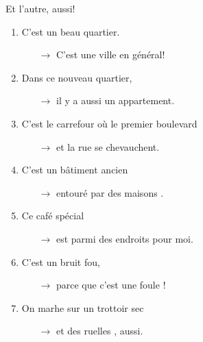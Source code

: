 \begin{frame}{Et l'autre, aussi!}
  \begin{enumerate}
    \item C'est un \alert{beau} quartier.
    \begin{itemize}
      \item[$\to$] C'est une \underline{} ville en général!
    \end{itemize}
    \item Dans ce \alert{nouveau} quartier,
    \begin{itemize}
      \item[$\to$] il y a aussi un \underline{} appartement.
    \end{itemize}
    \item C'est le carrefour où le \alert{premier} boulevard
    \begin{itemize}
      \item[$\to$] et la \underline{} rue se chevauchent.
    \end{itemize}
    \item C'est un bâtiment \alert{ancien}
    \begin{itemize}
      \item[$\to$] entouré par des maisons \underline{}.
    \end{itemize}
    \item Ce café \alert{spécial}
    \begin{itemize}
      \item[$\to$] est parmi des endroits \underline{} pour moi.
    \end{itemize}
    \item C'est un bruit \alert{fou},
    \begin{itemize}
      \item[$\to$] parce que c'est une foule \underline{}!
    \end{itemize}
    \item On marhe sur un trottoir \alert{sec}
    \begin{itemize}
      \item[$\to$] et des ruelles \underline{}, aussi.
    \end{itemize}
  \end{enumerate}
\end{frame}